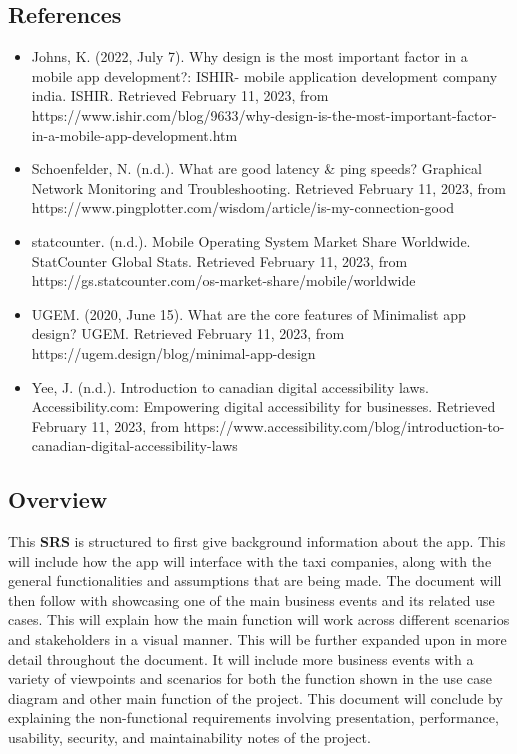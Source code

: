 \documentclass[]{article}
\begin{document}
\subsection{References}
\label{sub:references}
\begin{itemize}
	\item Johns, K. (2022, July 7). Why design is the most important factor in a mobile app development?: ISHIR- mobile application development company india. ISHIR. Retrieved February 11, 2023, from https://www.ishir.com/blog/9633/why-design-is-the-most-important-factor-in-a-mobile-app-development.htm 
	\item Schoenfelder, N. (n.d.). What are good latency \& ping speeds? Graphical Network Monitoring and Troubleshooting. Retrieved February 11, 2023, from https://www.pingplotter.com/wisdom/article/is-my-connection-good 
	\item statcounter. (n.d.). Mobile Operating System Market Share Worldwide. StatCounter Global Stats. Retrieved February 11, 2023, from https://gs.statcounter.com/os-market-share/mobile/worldwide 
	\item UGEM. (2020, June 15). What are the core features of Minimalist app design? UGEM. Retrieved February 11, 2023, from https://ugem.design/blog/minimal-app-design 
	\item Yee, J. (n.d.). Introduction to canadian digital accessibility laws. Accessibility.com: Empowering digital accessibility for businesses. Retrieved February 11, 2023, from https://www.accessibility.com/blog/introduction-to-canadian-digital-accessibility-laws 
\end{itemize}

\subsection{Overview}
\label{sub:overview}
This \textbf{SRS} is structured to first give background information about the app. This will include how the app will interface with the taxi companies, along with the general functionalities and assumptions that are being made. The document will then follow with showcasing one of the main business events and its related use cases. This will explain how the main function will work across different scenarios and stakeholders in a visual manner. This will be further expanded upon in more detail throughout the document. It will include more business events with a variety of viewpoints and scenarios for both the function shown in the use case diagram and other main function of the project. This document will conclude by explaining the non-functional requirements involving presentation, performance, usability, security, and maintainability notes of the project.
\end{document}
